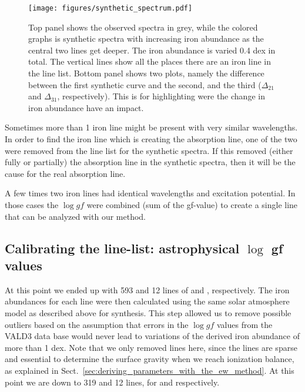 \documentclass{aa}
\begin{document}
\begin{figure}[tpb]
    \centering
    \texttt{[image: figures/synthetic\_spectrum.pdf]}
    \caption{Top panel shows the observed spectra in grey, while
        the colored graphs is synthetic spectra with increasing iron
        abundance as the central two lines get deeper. The iron abundance
        is varied 0.4 dex in total. The vertical lines show all the places
        there are an iron line in the line list. Bottom panel shows
        two plots, namely the difference between the first synthetic curve
        and the second, and the third ($\Delta_{21}$ and $\Delta_{31}$,
        respectively). This is for highlighting were the change in iron
        abundance have an impact.}
    \label{fig:synthesis}
\end{figure}


Sometimes more than 1 iron line might be present with very similar
wavelengths. In order to find the iron line which is creating the
absorption line, one of the two were removed from the line list for
the synthetic spectra. If this removed (either fully or partially) the
absorption line in the synthetic spectra, then it will be the cause for
the real absorption line.

A few times two iron lines had identical wavelengths and excitation
potential. In those cases the $\log \mathit{gf}$ were combined (sum of
the gf-value) to create a single line that can be analyzed with our
method.


\subsection{Calibrating the line-list: astrophysical $\log$ gf values}
\label{ssub:Recalibrating-the-atomic-data}

At this point we ended up with 593 and 12 lines of  and ,
respectively. The iron abundances for each line were then calculated
using the same solar atmosphere model as described above for
synthesis. This step allowed us to remove possible outliers
based on the assumption that errors in the $\log \mathit{gf}$ values
from the VALD3 data base would never lead to variations of the derived
iron abundance of more than 1 dex. Note that we only removed  lines
here, since the  lines are sparse and essential to determine the
surface gravity when we reach ionization balance, as explained in
Sect.~\ref{sec:deriving_parameters_with_the_ew_method}. At this point we
are down to 319 and 12 lines, for  and  respectively.
\end{document}
